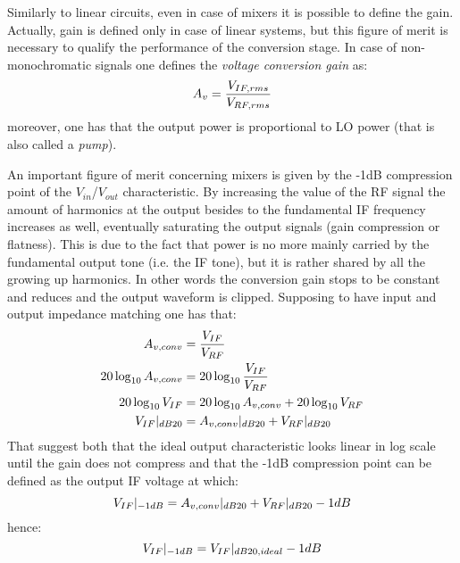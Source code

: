 Similarly to linear circuits, even in case of mixers it is possible to define the gain. Actually, gain is defined only in case of linear systems, but this figure of merit is necessary to qualify the performance of the conversion stage.
In case of non-monochromatic signals one defines the \emph{voltage conversion gain} as:
\begin{equation}
	A_v= \frac{V_{IF,rms}}{V_{RF,rms}} \notag
\end{equation}
moreover, one has that the output power is proportional to LO power (that is also called a \emph{pump}).

An important figure of merit concerning mixers is given by the -1dB compression point of the $V_{in}$/$V_{out}$ characteristic. By increasing the value of the RF signal the amount of harmonics at the output besides to the fundamental IF frequency increases as well, eventually saturating the output signals (gain compression or flatness). This is due to the fact that power is no more mainly carried by the fundamental output tone (i.e. the IF tone), but it is rather shared by all the growing up harmonics. In other words the conversion gain stops to be constant and reduces and the output waveform is clipped. Supposing to have input and output impedance matching one has that:
\begin{align}
	A_{v,conv}&=\frac{V_{IF}}{V_{RF}} \notag \\
	20\log_{10}A_{v,conv} & = 20\log_{10}\frac{V_{IF}}{V_{RF}}  \notag \\
	20\log_{10}V_{IF} & = 20\log_{10}A_{v,conv} + 20\log_{10}V_{RF} \notag \\	V_{IF}|_{dB20} &= A_{v,conv}|_{dB20} + V_{RF}|_{dB20} \notag
\end{align}
That suggest both that the ideal output characteristic looks linear in log scale until the gain does not compress and that the -1dB compression point can be defined as the output IF voltage at which:
\begin{equation}
V_{IF}|_{-1dB} = A_{v,conv}|_{dB20} + V_{RF}|_{dB20} -1dB \notag
\end{equation}
hence:
\begin{equation}
V_{IF}|_{-1dB} = V_{IF}|_{dB20,ideal} -1dB \notag
\end{equation}

